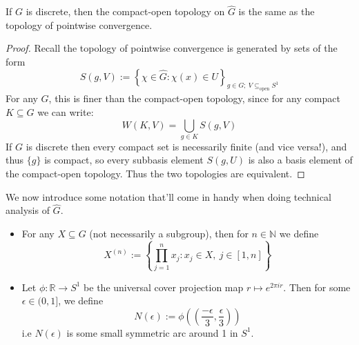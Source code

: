 \documentclass[11pt, x11names, openany]{book}
\newcommand{\nn}{\mathbb{N}}
\newcommand{\rr}{\mathbb{R}}
\newcommand{\set}[1]{\left\{ #1 \right\}}
\renewcommand{\brack}[1]{\left(   #1 \right)}
\renewcommand{\hat}{\widehat}
\begin{document}
\begin{prop}
\label{compact-open = ptwise convergence}
If $G$ is discrete, then  the compact-open topology on $\hat{G}$ is the same as the topology 
of pointwise convergence.
\end{prop}
\begin{proof}
Recall the topology of pointwise convergence is generated by sets of the form
\begin{equation*}
    S(g, V) := \set{\chi \in \hat{G} : \chi(x) \in U}_{g \in G; \ V \subseteq_{\textrm{open}} S^1}
\end{equation*}
For any $G$, this is finer than the compact-open topology, since for any compact $K \subseteq G$ we can write:
\begin{equation*}
    W(K, V) = \bigcup_{g \in K} S(g, V)
\end{equation*} 
If $G$ is discrete then every compact set is necessarily finite (and vice versa!), and thus $\{g\}$ is compact, so every subbasis element $S(g, U)$ is also a basis element of the compact-open topology. Thus the two topologies are equivalent.
\end{proof}

We now introduce some notation that'll come in handy when doing technical analysis of $\hat{G}$.
\begin{itemize}
    \item For any $X \subseteq G$ (not necessarily a subgroup), then for $n \in \nn$ we define
    \begin{equation*}
        X^{(n)} := \set{\prod^n_{j=1} x_j: x_j \in X, \ j \in [1, n]}
    \end{equation*}
    \item Let $\phi: \rr \to S^1$ be the universal cover projection map $r \mapsto e^{2 \pi i r}$.
    Then for some $\epsilon \in (0, 1]$, we define
    \begin{equation*}
        N(\epsilon) := \phi\brack{\brack{\frac{-\epsilon}{3}, \frac{\epsilon}{3}}}
    \end{equation*}
    i.e $N(\epsilon)$ is some small symmetric arc around 1 in $S^1$.
\end{itemize}
\end{document}
